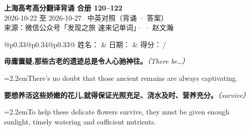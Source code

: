 \documentclass[11pt,a4paper]{article}
\newcommand{\num}[1]{\makebox[1.9em][r]{#1.}\hspace{0.3em}}
\newcommand{\prompt}[1]{\emph{\textcolor{tipblue}{\small（#1）}}}
\begin{document}
\pagestyle{plain}
\begin{center}
{\LARGE\bfseries 上海高考高分翻译背诵 \quad 合册 120–122}\\[0.25em]
{\large 2026-10-22 至 2026-10-27 \quad\ 中英对照（背诵 · 答案）}\\[0.35em]
{\footnotesize 来源：微信公众号「发现之旅 速来记单词」·  · 赵文瀚}
\end{center}

\vspace{0.4em}
\noindent\begin{tabular}{@{}p{0.33\textwidth}@{}p{0.34\textwidth}@{}p{0.33\textwidth}@{}}
姓名：\underline{\hspace{2.0cm}} & 日期：\underline{\hspace{2.0cm}} & 得分：\underline{\hspace{1.4cm}}\,/ \\
\end{tabular}

\vspace{0.5em}

\vspace{0.8em}
\vspace{0.35em}\vspace{0.15em}

\begin{minipage}{\linewidth}

\num{1}\textbf{毋庸置疑,那些古老的遗迹总是令人心驰神往。}\prompt{There be…}

\vspace{0.15em}

\noindent\hangindent=2.2em\hspace{2.2em}There’s no doubt that those ancient remains are always captivating.

\end{minipage}

\begin{minipage}{\linewidth}

\num{2}\textbf{要想养活这些娇嫩的花儿,就得保证光照充足、浇水及时、营养充分。}\prompt{survive}

\vspace{0.15em}

\noindent\hangindent=2.2em\hspace{2.2em}To help these delicate flowers survive, they must be given enough sunlight, timely watering and sufficient nutrients.

\end{minipage}
\end{document}
